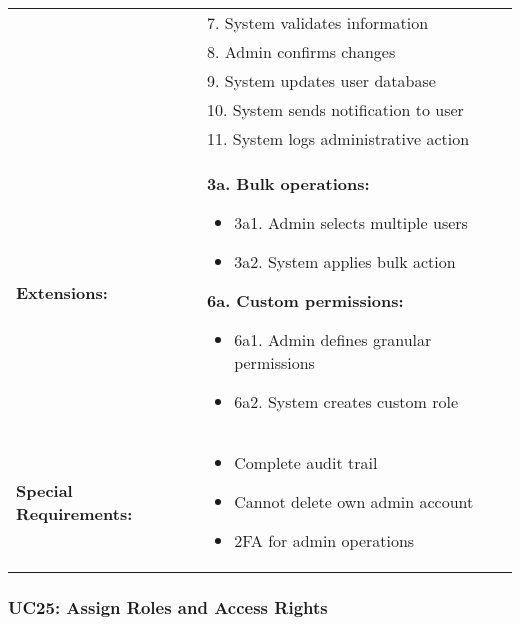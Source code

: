 \documentclass[12pt]{article}
\begin{document}
\begin{longtable}{|p{3cm}|p{11cm}|}
& 7. System validates information \\
& 8. Admin confirms changes \\
& 9. System updates user database \\
& 10. System sends notification to user \\
& 11. System logs administrative action \\
\hline
\textbf{Extensions:} & 
\textbf{3a. Bulk operations:}
\begin{itemize}
    \item 3a1. Admin selects multiple users
    \item 3a2. System applies bulk action
\end{itemize}
\textbf{6a. Custom permissions:}
\begin{itemize}
    \item 6a1. Admin defines granular permissions
    \item 6a2. System creates custom role
\end{itemize} \\
\hline
\textbf{Special Requirements:} & 
\begin{itemize}
    \item Complete audit trail
    \item Cannot delete own admin account
    \item 2FA for admin operations
\end{itemize} \\
\hline
\end{longtable}


\subsubsection{UC25: Assign Roles and Access Rights}
\end{document}
